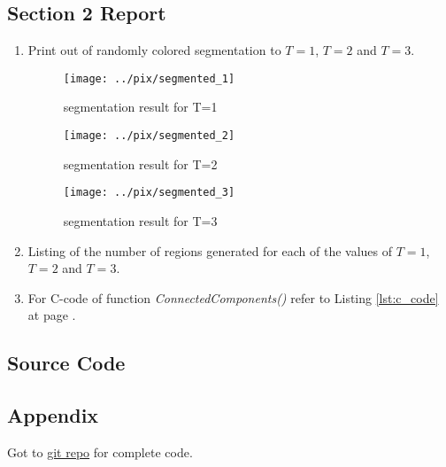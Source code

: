 \documentclass[a4paper,11pt]{article}
\newcommand{\reflst}[1]{Listing \ref{#1} at page \pageref{#1}}
\begin{document}
\subsection*{Section 2 Report} 
\begin{enumerate}
\item Print out of randomly colored segmentation to $T=1$, $T=2$ and $T=3$.
 
\begin{figure}[!hp]
\centering
\texttt{[image: ../pix/segmented\_1]}
\caption{segmentation result for T=1}
\end{figure}

\clearpage
\begin{figure}[!hp]
\centering
\texttt{[image: ../pix/segmented\_2]}
\caption{segmentation result for T=2}
\end{figure}

\clearpage
\begin{figure}[!hp]
\centering
\texttt{[image: ../pix/segmented\_3]}
\caption{segmentation result for T=3}
\end{figure}

\item Listing of the number of regions generated for each of the values of $T=1$, $T=2$ and $T=3$.



\item For C-code of function \textit{ConnectedComponents()} refer to \reflst{lst:c_code}.
\end{enumerate}

\newpage
\subsection*{Source Code}%


\newpage
\subsection*{Appendix}
Got to \href{https://github.com/rahuldeshmukh43/Courses/tree/master/ECE637-DigitalImageProcessing-I/labs/lab3/code}{git repo} for complete code.


% 
\end{document}
